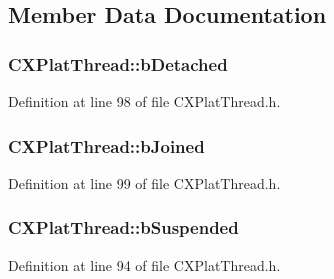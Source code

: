 \subsection{\-Member \-Data \-Documentation}
\hypertarget{class_c_x_plat_thread_aebdedede286d9cf03841c44615478e4a}{
\subsubsection[{b\-Detached}]{ {\bf \-C\-X\-Plat\-Thread\-::b\-Detached}}}\label{class_c_x_plat_thread_aebdedede286d9cf03841c44615478e4a}


\-Definition at line 98 of file \-C\-X\-Plat\-Thread.\-h.

\hypertarget{class_c_x_plat_thread_a15720f77b93771acd0d2b59f042eb8d6}{
\subsubsection[{b\-Joined}]{ {\bf \-C\-X\-Plat\-Thread\-::b\-Joined}}}\label{class_c_x_plat_thread_a15720f77b93771acd0d2b59f042eb8d6}


\-Definition at line 99 of file \-C\-X\-Plat\-Thread.\-h.

\hypertarget{class_c_x_plat_thread_a91939e9102e3d7a3be728e861e2e4344}{
\subsubsection[{b\-Suspended}]{ {\bf \-C\-X\-Plat\-Thread\-::b\-Suspended}}}\label{class_c_x_plat_thread_a91939e9102e3d7a3be728e861e2e4344}


\-Definition at line 94 of file \-C\-X\-Plat\-Thread.\-h.

